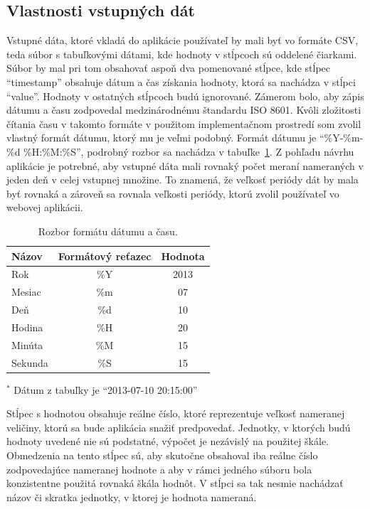 \documentclass[a4paper,slovak,12pt,appendix]{article}
\begin{document}
\subsection{Vlastnosti vstupných dát}
Vstupné dáta, ktoré vkladá do aplikácie používateľ by mali byť vo formáte CSV,
teda súbor s tabuľkovými dátami, kde hodnoty v stĺpcoch sú oddelené čiarkami.
Súbor by mal pri tom obsahovať aspoň dva pomenované stĺpce, kde stĺpec ``timestamp''
obsahuje dátum a čas získania hodnoty, ktorá sa nachádza v stĺpci ``value''.
Hodnoty v ostatných stĺpcoch budú ignorované.
Zámerom bolo, aby zápis dátumu a času zodpovedal medzinárodnému štandardu
ISO 8601. Kvôli zložitosti čítania času v takomto formáte v použitom
implementačnom prostredí som zvolil vlastný formát dátumu, ktorý mu je veľmi
podobný. Formát dátumu je ``\%Y-\%m-\%d \%H:\%M:\%S'', podrobný rozbor sa
nachádza v tabuľke~\ref{tab-timestamp}. Z pohľadu návrhu aplikácie je potrebné,
aby vstupné dáta mali rovnaký počet meraní nameraných v jeden deň v celej
vstupnej množine. To znamená, že veľkosť periódy dát by mala byť rovnaká
a zároveň sa rovnala veľkosti periódy, ktorú zvolil používateľ vo webovej
aplikácii.

\begin{table}[ht]
  \centering
  \caption{Rozbor formátu dátumu a času.}
  \label{tab-timestamp}
  \begin{threeparttable}
    \begin{tabular}{|l|c|c|}
      \hline
      \textbf{Názov}  &   \textbf{Formátový reťazec}  &   \textbf{Hodnota}  \\ \hline
      Rok     & \%Y & 2013 \\ \hline
      Mesiac  & \%m & 07 \\ \hline
      Deň     & \%d & 10 \\ \hline
      Hodina  & \%H & 20 \\ \hline
      Minúta  & \%M & 15 \\ \hline
      Sekunda & \%S & 15 \\ \hline
    \end{tabular}
    \begin{tablenotes} \footnotesize
      \item $^{*}$ Dátum z tabuľky je ``2013-07-10 20:15:00''
    \end{tablenotes}
  \end{threeparttable}
\end{table}

Stĺpec s hodnotou obsahuje reálne číslo, ktoré reprezentuje veľkosť nameranej
veličiny, ktorú sa bude aplikácia snažiť predpovedať. Jednotky, v ktorých budú hodnoty
uvedené nie sú podstatné, výpočet je nezávislý na použitej škále. Obmedzenia
na tento stĺpec sú, aby skutočne obsahoval iba reálne číslo zodpovedajúce
nameranej hodnote a aby v rámci jedného súboru bola konzistentne použitá
rovnaká škála hodnôt. V stĺpci sa tak nesmie nachádzať názov či skratka
jednotky, v ktorej je hodnota nameraná.
\end{document}
